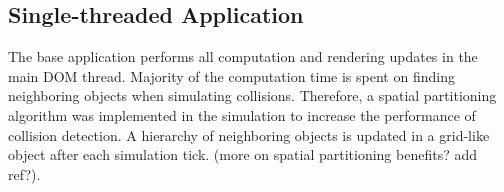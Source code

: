 \documentclass[conference, 9pt]{IEEEtran}
\begin{document}


\subsection{Single-threaded Application}
\label{sec:single}

The base application performs all computation and rendering updates in the main DOM thread. Majority of the computation time is spent on finding neighboring objects when simulating collisions. Therefore, a spatial partitioning algorithm was implemented in the simulation to increase the performance of collision detection. A hierarchy of neighboring objects is updated in a grid-like object after each simulation tick. (more on spatial partitioning benefits? add ref?).




\end{document}
